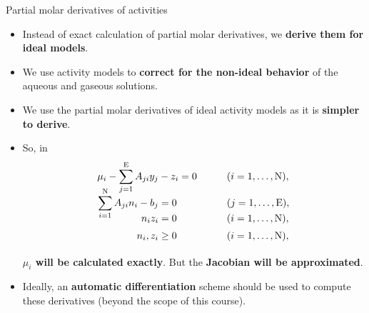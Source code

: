 \begin{frame}{Partial molar derivatives of activities}
\begin{itemize}[<+->]
\item Instead of exact calculation of partial molar derivatives, 
we {\bf derive  them for ideal models}.
\item We use activity models to {\bf correct for the non-ideal behavior}
of the aqueous and gaseous solutions.
\item We use the partial molar derivatives of ideal activity models as it is {\bf simpler to derive}. 
%
\item So, in\\[-30pt]
%
\begin{alignat*}{2}
	\mu_{i}-\sum_{j=1}^{\text{E}}A_{ji}y_{j} & -z_{i}=0 & \qquad\vphantom{\frac{\partial L}{\partial y_{j}}} & (i=1,\ldots,\text{N}),\\[-10pt]
	\sum_{i=1}^{\text{N}}A_{ji}n_{i}-b_{j} & =0 & \vphantom{\frac{\partial L}{\partial y_{j}}} & (j=1,\ldots,\text{E}),\\[-15pt]
	n_{i}z_{i} & =0 & \vphantom{\frac{\partial L}{\partial y_{j}}} & (i=1,\ldots,\text{N}),\\[-10pt]
	n_{i},z_{i} & \geq0 & \vphantom{\frac{\partial L}{\partial y_{j}}} & (i=1,\ldots,\text{N}),
\end{alignat*}
%
\alert{\bf $\mu_{i}$ will be calculated exactly}. But the {\bf Jacobian will be approximated}.
%
\item Ideally, an \alert{\bf automatic differentiation} scheme should be used
to compute these derivatives (beyond the scope of this course).
\end{itemize}

\end{frame}
%
%
